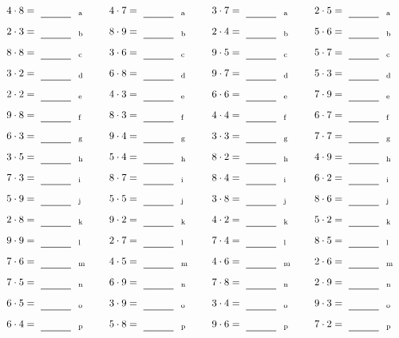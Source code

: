 \documentclass
[
  draft    = true,
  fontsize = 11pt,
  parskip  = half-
]
{scrartcl}
\begin{document}
\par\vfill\par
\begin{align*}
    \pline{4\cdot8}&=\rline{a}
  & \pline{4\cdot7}&=\rline{a}
  & \pline{3\cdot7}&=\rline{a}
  & \pline{2\cdot5}&=\rline{a} \\[1ex]
    \pline{2\cdot3}&=\rline{b}
  & \pline{8\cdot9}&=\rline{b}
  & \pline{2\cdot4}&=\rline{b}
  & \pline{5\cdot6}&=\rline{b} \\[1ex]
    \pline{8\cdot8}&=\rline{c}
  & \pline{3\cdot6}&=\rline{c}
  & \pline{9\cdot5}&=\rline{c}
  & \pline{5\cdot7}&=\rline{c} \\[1ex]
    \pline{3\cdot2}&=\rline{d}
  & \pline{6\cdot8}&=\rline{d}
  & \pline{9\cdot7}&=\rline{d}
  & \pline{5\cdot3}&=\rline{d} \\[1ex]
    \pline{2\cdot2}&=\rline{e}
  & \pline{4\cdot3}&=\rline{e}
  & \pline{6\cdot6}&=\rline{e}
  & \pline{7\cdot9}&=\rline{e} \\[1ex]
    \pline{9\cdot8}&=\rline{f}
  & \pline{8\cdot3}&=\rline{f}
  & \pline{4\cdot4}&=\rline{f}
  & \pline{6\cdot7}&=\rline{f} \\[1ex]
    \pline{6\cdot3}&=\rline{g}
  & \pline{9\cdot4}&=\rline{g}
  & \pline{3\cdot3}&=\rline{g}
  & \pline{7\cdot7}&=\rline{g} \\[1ex]
    \pline{3\cdot5}&=\rline{h}
  & \pline{5\cdot4}&=\rline{h}
  & \pline{8\cdot2}&=\rline{h}
  & \pline{4\cdot9}&=\rline{h} \\[1ex]
    \pline{7\cdot3}&=\rline{i}
  & \pline{8\cdot7}&=\rline{i}
  & \pline{8\cdot4}&=\rline{i}
  & \pline{6\cdot2}&=\rline{i} \\[1ex]
    \pline{5\cdot9}&=\rline{j}
  & \pline{5\cdot5}&=\rline{j}
  & \pline{3\cdot8}&=\rline{j}
  & \pline{8\cdot6}&=\rline{j} \\[1ex]
    \pline{2\cdot8}&=\rline{k}
  & \pline{9\cdot2}&=\rline{k}
  & \pline{4\cdot2}&=\rline{k}
  & \pline{5\cdot2}&=\rline{k} \\[1ex]
    \pline{9\cdot9}&=\rline{l}
  & \pline{2\cdot7}&=\rline{l}
  & \pline{7\cdot4}&=\rline{l}
  & \pline{8\cdot5}&=\rline{l} \\[1ex]
    \pline{7\cdot6}&=\rline{m}
  & \pline{4\cdot5}&=\rline{m}
  & \pline{4\cdot6}&=\rline{m}
  & \pline{2\cdot6}&=\rline{m} \\[1ex]
    \pline{7\cdot5}&=\rline{n}
  & \pline{6\cdot9}&=\rline{n}
  & \pline{7\cdot8}&=\rline{n}
  & \pline{2\cdot9}&=\rline{n} \\[1ex]
    \pline{6\cdot5}&=\rline{o}
  & \pline{3\cdot9}&=\rline{o}
  & \pline{3\cdot4}&=\rline{o}
  & \pline{9\cdot3}&=\rline{o} \\[1ex]
    \pline{6\cdot4}&=\rline{p}
  & \pline{5\cdot8}&=\rline{p}
  & \pline{9\cdot6}&=\rline{p}
  & \pline{7\cdot2}&=\rline{p}
\end{align*}
\end{document}
